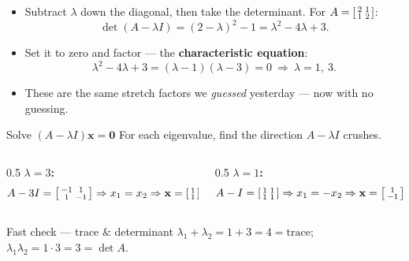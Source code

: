 \documentclass[aspectratio=169, 11pt]{beamer}
\newcommand{\xx}{\mathbf{x}}
\newcommand{\zero}{\mathbf{0}}
\begin{document}
\begin{frame}[t, plain]
  \begin{itemize}
    \setlength{\itemsep}{6pt}
    \item Subtract $\lambda$ down the diagonal, then take the determinant. For
          $A=\begin{bsmallmatrix} 2 & 1\\ 1 & 2 \end{bsmallmatrix}$:
          \[ \det(A-\lambda I)=(2-\lambda)^2-1=\lambda^2-4\lambda+3. \]
    \item Set it to zero and factor --- the \textbf{characteristic equation}:
          \[ \lambda^2-4\lambda+3=(\lambda-1)(\lambda-3)=0 \ \Longrightarrow\ \lambda=1,\ 3. \]
    \item These are the same stretch factors we \emph{guessed} yesterday --- now with no guessing.
  \end{itemize}
\end{frame}

\begin{frame}[t, plain]
  \begin{block}{Solve $(A-\lambda I)\xx=\zero$}
    For each eigenvalue, find the direction $A-\lambda I$ crushes.
  \end{block}
  \begin{columns}[T]
    \begin{column}{0.5\textwidth}
      \textbf{$\lambda=3$:}
      \[ A-3I=\begin{bsmallmatrix} -1 & 1\\ 1 & -1 \end{bsmallmatrix} \Rightarrow x_1=x_2 \Rightarrow \xx=\begin{bsmallmatrix} 1\\ 1 \end{bsmallmatrix}. \]
    \end{column}
    \begin{column}{0.5\textwidth}
      \textbf{$\lambda=1$:}
      \[ A-I=\begin{bsmallmatrix} 1 & 1\\ 1 & 1 \end{bsmallmatrix} \Rightarrow x_1=-x_2 \Rightarrow \xx=\begin{bsmallmatrix} 1\\ -1 \end{bsmallmatrix}. \]
    \end{column}
  \end{columns}
  \vspace{4pt}
  \begin{block}{Fast check --- trace \& determinant}
    $\lambda_1+\lambda_2 = 1+3 = 4 = \text{trace}$; \quad $\lambda_1\lambda_2 = 1\cdot 3 = 3 = \det A$.
  \end{block}
\end{frame}
\end{document}
